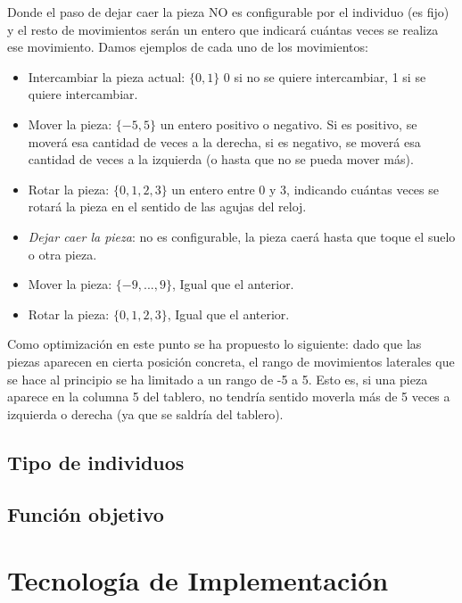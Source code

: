 \documentclass[11pt,spanish,listoffigures,listoftables]{tfgetsinf}
\begin{document}
Donde el paso de dejar caer la pieza NO es configurable por el individuo (es fijo) y el resto de movimientos serán un entero que indicará cuántas veces se realiza ese movimiento. Damos ejemplos de cada uno de los movimientos:
\begin{itemize}
    \item Intercambiar la pieza actual: $\{0, 1\}$ 0 si no se quiere intercambiar, 1 si se quiere intercambiar.
    \item Mover la pieza: $\{-5, 5\}$ un entero positivo o negativo. Si es positivo, se moverá esa cantidad de veces a la derecha, si es negativo, se moverá esa cantidad de veces a la izquierda (o hasta que no se pueda mover más).
    \item Rotar la pieza: $\{0, 1, 2, 3\}$ un entero entre 0 y 3, indicando cuántas veces se rotará la pieza en el sentido de las agujas del reloj.
    \item \textit{Dejar caer la pieza}: no es configurable, la pieza caerá hasta que toque el suelo o otra pieza.
    \item Mover la pieza: $\{-9, ..., 9\}$, Igual que el anterior.
    \item Rotar la pieza: $\{0, 1, 2, 3\}$, Igual que el anterior.
\end{itemize}

Como optimización en este punto se ha propuesto lo siguiente: dado que las piezas aparecen en cierta posición concreta, el rango de movimientos laterales que se hace al principio se ha limitado a un rango de -5 a 5. Esto es, si una pieza aparece en la columna 5 del tablero, no tendría sentido moverla más de 5 veces a izquierda o derecha (ya que se saldría del tablero).

\section{Tipo de individuos}

\section{Función objetivo}

\chapter{Tecnología de Implementación}

\end{document}
